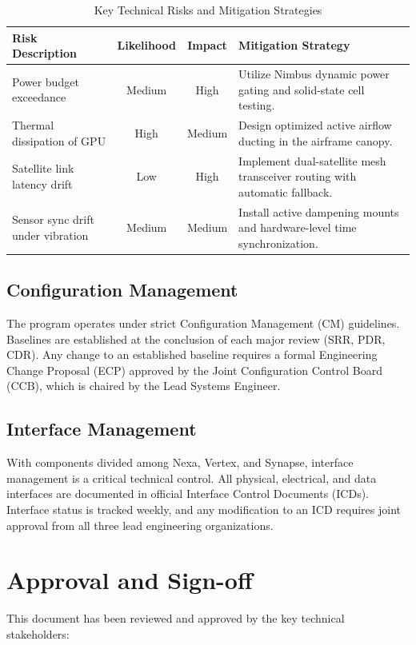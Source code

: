 \documentclass[10pt,letterpaper]{article}
\begin{document}
\begin{table}[htbp]
\centering
\caption{Key Technical Risks and Mitigation Strategies}
\label{tab:risk_matrix}
\small
\begin{tabularx}{\textwidth}{l c c X}
\toprule
\textbf{Risk Description} & \textbf{Likelihood} & \textbf{Impact} & \textbf{Mitigation Strategy} \\
\midrule
Power budget exceedance & Medium & High & Utilize Nimbus dynamic power gating and solid-state cell testing. \\
Thermal dissipation of GPU & High & Medium & Design optimized active airflow ducting in the airframe canopy. \\
Satellite link latency drift & Low & High & Implement dual-satellite mesh transceiver routing with automatic fallback. \\
Sensor sync drift under vibration & Medium & Medium & Install active dampening mounts and hardware-level time synchronization. \\
\bottomrule
\end{tabularx}
\end{table}

\subsection{Configuration Management}
The program operates under strict Configuration Management (CM) guidelines. Baselines are established at the conclusion of each major review (SRR, PDR, CDR). Any change to an established baseline requires a formal Engineering Change Proposal (ECP) approved by the Joint Configuration Control Board (CCB), which is chaired by the Lead Systems Engineer.

\subsection{Interface Management}
With components divided among Nexa, Vertex, and Synapse, interface management is a critical technical control. All physical, electrical, and data interfaces are documented in official Interface Control Documents (ICDs). Interface status is tracked weekly, and any modification to an ICD requires joint approval from all three lead engineering organizations.

\section{Approval and Sign-off}
This document has been reviewed and approved by the key technical stakeholders:
\end{document}
